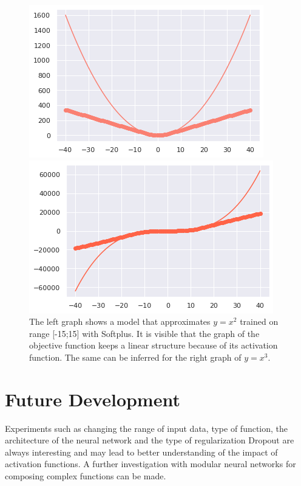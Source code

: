 \documentclass{article}
\begin{document}
\begin{figure}[H]
\begin{multicols}{2}
    \includegraphics[width=\linewidth]{softplus2.png}\par
    \includegraphics[width=\linewidth]{softplus3.png}\par
\end{multicols}
\caption{The left graph shows a model that approximates $y = x^2$ trained on range [-15;15] with Softplus. It is visible that the graph of the objective function keeps a linear structure because of its activation function. The same can be inferred for the right graph of $y=x^3$.}
\end{figure}
\newpage



\section{Future Development}
\label{Future Work}
Experiments such as changing the range of input data, type of function, the architecture of the neural network and the type of regularization Dropout\cite{dropout} are always interesting and may lead to better understanding of the impact of activation functions.
A further investigation with modular neural networks \cite{gnn} for composing complex functions can be made.
\end{document}
